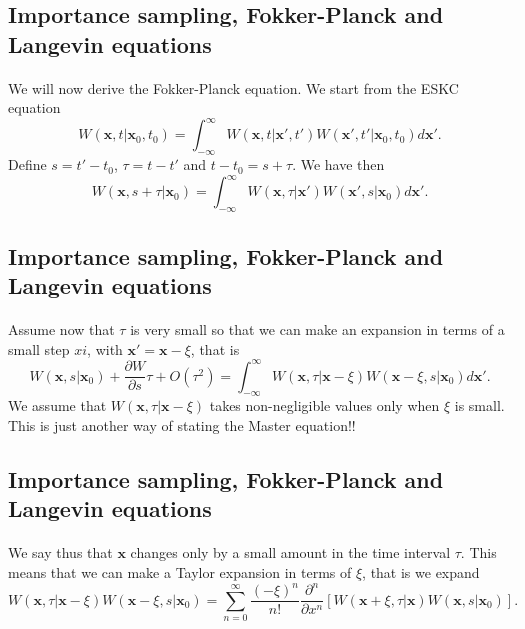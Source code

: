 \documentclass[%
twoside,                 %
final,                   %
10pt]{article}
\begin{document}
\subsection*{Importance sampling, Fokker-Planck and Langevin equations}

\paragraph{}
We will now derive the Fokker-Planck equation. 
We start from the ESKC equation
\[
 W(\mathbf{x},t|\mathbf{x}_0,t_0)  = \int_{-\infty}^{\infty} W(\mathbf{x},t|\mathbf{x}',t')W(\mathbf{x}',t'|\mathbf{x}_0,t_0)d\mathbf{x}'.
\]
Define $s=t'-t_0$, $\tau=t-t'$ and $t-t_0=s+\tau$. We have then
\[
 W(\mathbf{x},s+\tau|\mathbf{x}_0)  = \int_{-\infty}^{\infty} W(\mathbf{x},\tau|\mathbf{x}')W(\mathbf{x}',s|\mathbf{x}_0)d\mathbf{x}'.
\]




\subsection*{Importance sampling, Fokker-Planck and Langevin equations}

\paragraph{}
Assume now that $\tau$ is very small so that we can make an expansion in terms of a small step $xi$, with $\mathbf{x}'=\mathbf{x}-\xi$, that is
\[
 W(\mathbf{x},s|\mathbf{x}_0)+\frac{\partial W}{\partial s}\tau +O(\tau^2) = \int_{-\infty}^{\infty} W(\mathbf{x},\tau|\mathbf{x}-\xi)W(\mathbf{x}-\xi,s|\mathbf{x}_0)d\mathbf{x}'.
\]
We assume that $W(\mathbf{x},\tau|\mathbf{x}-\xi)$ takes non-negligible values only when $\xi$ is small. This is just another way of stating the Master equation!!




\subsection*{Importance sampling, Fokker-Planck and Langevin equations}

\paragraph{}
We say thus that $\mathbf{x}$ changes only by a small amount in the time interval $\tau$. 
This means that we can make a Taylor expansion in terms of $\xi$, that is we
expand
\[
W(\mathbf{x},\tau|\mathbf{x}-\xi)W(\mathbf{x}-\xi,s|\mathbf{x}_0) =
\sum_{n=0}^{\infty}\frac{(-\xi)^n}{n!}\frac{\partial^n}{\partial x^n}\left[W(\mathbf{x}+\xi,\tau|\mathbf{x})W(\mathbf{x},s|\mathbf{x}_0)
\right].
\]
\end{document}
